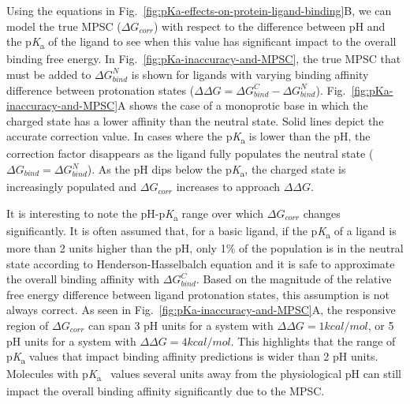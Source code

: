 \documentclass[9pt,lineno,final]{elife}
\newcommand{\pKa}{p\textit{K}\textsubscript{a}}
\begin{document}
Using the equations in Fig.~\ref{fig:pKa-effects-on-protein-ligand-binding}B, we can model the true MPSC ($\Delta G_{corr}$) with respect to the difference between pH and the \pKa{} of the ligand to see when this value has significant impact to the overall binding free energy. 
In Fig.~\ref{fig:pKa-inaccuracy-and-MPSC}, the true MPSC that must be added to $\Delta G_{bind}^{N}$ is shown for ligands with varying binding affinity difference between protonation states ($\Delta\Delta G = \Delta G_{bind}^{C} - \Delta G_{bind}^{N}$). Fig.~\ref{fig:pKa-inaccuracy-and-MPSC}A shows the case of a monoprotic base in which the charged state has a lower affinity than the neutral state. 
Solid lines depict the accurate correction value. 
In cases where the \pKa{} is lower than the pH, the correction factor disappears as the ligand fully populates the neutral state ($\Delta G_{bind} = \Delta G_{bind}^{N}$). 
As the pH dips below the \pKa{}, the charged state is increasingly populated and $\Delta G_{corr}$ increases to approach $\Delta\Delta G$. 

It is interesting to note the pH-\pKa{} range over which $\Delta G_{corr}$ changes significantly.
It is often assumed that, for a basic ligand, if the \pKa{} of a ligand is more than 2 units higher than the pH, only 1\% of the population is in the neutral state according to Henderson-Hasselbalch equation and it is safe to approximate the overall binding affinity with $\Delta G_{bind}^{C}$. 
Based on the magnitude of the relative free energy difference between ligand protonation states, this assumption is not always correct. 
As seen in Fig.~\ref{fig:pKa-inaccuracy-and-MPSC}A, the responsive region of $\Delta G_{corr}$ can span 3 pH units for a system with $\Delta\Delta G = 1 kcal/mol$, or 5 pH units for a system with $\Delta\Delta G = 4 kcal/mol$. 
This highlights that the range of \pKa{} values that impact binding affinity predictions is wider than 2 pH units. 
Molecules with \pKa{}~ values several units away from the physiological pH can still impact the overall binding affinity significantly due to the MPSC. 
\end{document}
